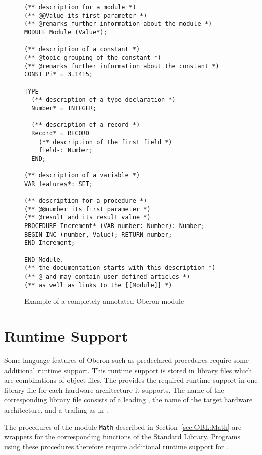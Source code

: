 \begin{figure}
\ttfamily\centering
\begin{minipage}{26em}\begin{verbatim}
(** description for a module *)
(** @@Value its first parameter *)
(** @remarks further information about the module *)
MODULE Module (Value*);

(** description of a constant *)
(** @topic grouping of the constant *)
(** @remarks further information about the constant *)
CONST Pi* = 3.1415;

TYPE
  (** description of a type declaration *)
  Number* = INTEGER;

  (** description of a record *)
  Record* = RECORD
    (** description of the first field *)
    field-: Number;
  END;

(** description of a variable *)
VAR features*: SET;

(** description for a procedure *)
(** @@number its first parameter *)
(** @result and its result value *)
PROCEDURE Increment* (VAR number: Number): Number;
BEGIN INC (number, Value); RETURN number;
END Increment;

END Module.
(** the documentation starts with this description *)
(** @ and may contain user-defined articles *)
(** as well as links to the [[Module]] *)
\end{verbatim}\end{minipage}
\normalfont\caption{Example of a completely annotated Oberon module}
\label{fig:obdocexample}
\end{figure}

\section{Runtime Support}\label{sec:obruntimesupport}

Some language features of Oberon such as predeclared procedures require some additional runtime support.
This runtime support is stored in library files which are combinations of object files. \seeobject
The \ecs{} provides the required runtime support in one library file for each hardware architecture it supports.
The name of the corresponding library file consists of a leading , the name of the target hardware architecture, and a trailing  as in .

The procedures of the module \texttt{Math} described in Section~\ref{sec:OBL:Math} are wrappers for the corresponding functions of the Standard \cpp{} Library.
Programs using these procedures therefore require additional runtime support for \cpp{}. \seecpp

